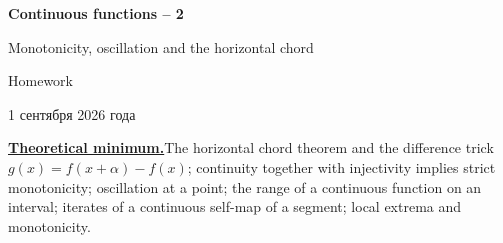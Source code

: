 \documentclass[11pt,a4paper]{article}
\begin{document}
\begin{center}
{\huge\bfseries Continuous functions -- 2\par}\vspace{1.07em}
{\Large Monotonicity, oscillation and the horizontal chord\par}\vspace{1.1em}
{\Large Homework\par}\vspace{1.1em}
{\foreignlanguage{russian}{1 сентября 2026 года}\par}
\end{center}\vspace{0pt}

\noindent\textbf{\underline{Theoretical minimum.}}\quad The horizontal chord theorem and the difference
trick $g(x)=f(x+\alpha)-f(x)$; continuity together with injectivity implies strict monotonicity;
oscillation at a point; the range of a continuous function on an interval; iterates of a continuous
self-map of a segment; local extrema and monotonicity.
\end{document}
